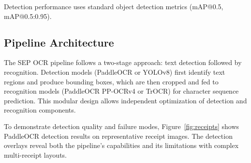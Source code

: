 \documentclass[11pt,a4paper]{article}
\begin{document}
Detection performance uses standard object detection metrics (mAP@0.5, mAP@0.5:0.95).

\subsection{Pipeline Architecture}
The SEP OCR pipeline follows a two-stage approach: text detection followed by recognition. Detection models (PaddleOCR or YOLOv8) first identify text regions and produce bounding boxes, which are then cropped and fed to recognition models (PaddleOCR PP-OCRv4 or TrOCR) for character sequence prediction. This modular design allows independent optimization of detection and recognition components.

To demonstrate detection quality and failure modes, Figure~\ref{fig:receipts} shows PaddleOCR detection results on representative receipt images. The detection overlays reveal both the pipeline's capabilities and its limitations with complex multi-receipt layouts.
\end{document}
